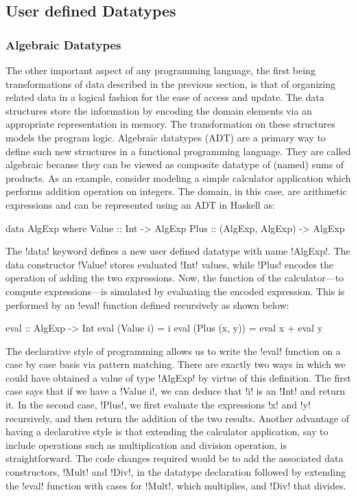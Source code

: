 \documentclass[screen,nonacm]{acmart}
\begin{document}
\subsection{User defined Datatypes}
\subsubsection{Algebraic Datatypes}
The other important aspect of any programming language, the first
being transformations of data described in the previous section, is
that of organizing related data in a logical fashion for the ease of
access and update. The data structures store the information by
encoding the domain elements via an appropriate representation in
memory. The transformation on these structures models the program
logic. Algebraic datatypes (ADT) are a primary way
to define such new structures in a functional programming language. They are called
algebraic because they can be viewed as composite datatype of (named)
sums of products. As an example, consider modeling a simple calculator
application which performs addition operation on integers. The domain,
in this case, are arithmetic expressions and can be represented using an
ADT in Haskell as:

\begin{CenteredBox}
\begin{code}
data AlgExp where
   Value :: Int -> AlgExp
   Plus :: (AlgExp, AlgExp) -> AlgExp
\end{code}
\end{CenteredBox}

The !data! keyword defines a new user defined datatype with name
!AlgExp!. The data constructor !Value! stores evaluated !Int! values,
while !Plus! encodes the operation of adding the two expressions. Now,
the function of the calculator---to compute expressions---is simulated
by evaluating the encoded expression. This is performed by an !eval!
function defined recursively as shown below:

\begin{CenteredBox}
\begin{code}
eval :: AlgExp -> Int
eval (Value i) = i
eval (Plus (x, y)) = eval x + eval y
\end{code}
\end{CenteredBox}

The declarative style of programming allows us to write the !eval!
function on a case by case basis via pattern
matching. There are exactly two ways in which we could have obtained a
value of type !AlgExp! by virtue of this definition. The first case says
that if we have a !Value i!, we can deduce that
!i! is an !Int! and return it. In the second case, !Plus!, we first
evaluate the expressions !x! and !y! recursively, and then return the
addition of the two results. Another advantage of having a declarative
style is that extending the calculator application, say to include
operations such as multiplication and division operation, is
straightforward. The code changes required would be to add the
associated data constructors, !Mult! and !Div!, in the datatype
declaration followed by extending the !eval! function with cases for
!Mult!, which multiplies, and !Div! that divides.
\end{document}
